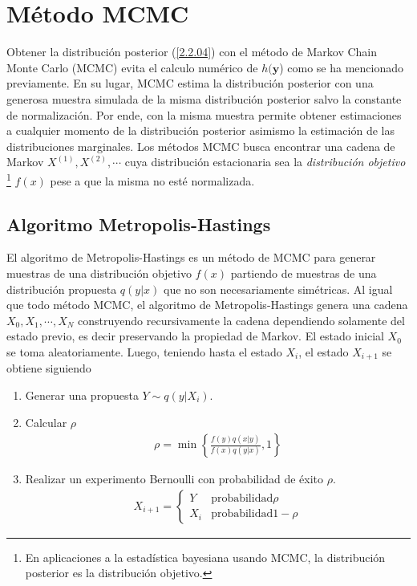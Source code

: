 \section{Método MCMC}

Obtener la distribución posterior (\ref{2.2.04}) con el método de Markov Chain Monte Carlo (MCMC) evita el calculo numérico de $h(\mathbf{y}$) como se ha mencionado previamente. En su lugar, MCMC estima la distribución posterior con una generosa muestra simulada de la misma distribución posterior salvo la constante de normalización. Por ende, con la misma muestra permite obtener estimaciones a cualquier momento de la distribución posterior asimismo la estimación de las distribuciones marginales. Los métodos MCMC busca encontrar una cadena de Markov $X^{(1)},X^{(2)},\cdots$ cuya distribución estacionaria sea la \textit{distribución objetivo} \footnote{En aplicaciones a la estadística bayesiana usando MCMC, la distribución posterior es la distribución objetivo.} $f(x)$ pese a que la misma no esté normalizada. 

\subsection{Algoritmo Metropolis-Hastings}

El algoritmo de Metropolis-Hastings es un método de MCMC para generar muestras de una distribución objetivo $f(x)$ partiendo de muestras de una distribución propuesta $q(y|x)$ que no son necesariamente simétricas. Al igual que todo método MCMC, el algoritmo de Metropolis-Hastings genera una cadena $X_0, X_1, \cdots, X_N$ construyendo recursivamente la cadena dependiendo solamente del estado previo, es decir preservando la propiedad de Markov. El estado inicial $X_0$ se toma aleatoriamente. Luego, teniendo hasta el estado $X_i$, el estado $X_{i+1}$ se obtiene siguiendo 
\begin{enumerate}
    \item Generar una propuesta $Y \sim q(y|X_i)$.
    \item Calcular $\rho$ 
    \begin{align*}
        \rho = \min \left \{ \frac{f(y)q(x|y)}{f(x)q(y|x)}, 1  \right \} 
    \end{align*}
    \item Realizar un experimento Bernoulli con probabilidad de éxito $\rho$.
    \begin{align*}
        X_{i+1} = \left\{\begin{matrix}
            Y & \text{probabilidad} \rho  \\ 
            X_{i}& \text{probabilidad} 1- \rho  
           \end{matrix}\right.
    \end{align*}
\end{enumerate}

